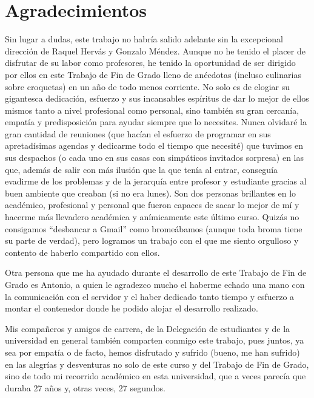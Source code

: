 
\chapter*{Agradecimientos}

Sin lugar a dudas, este trabajo no habría salido adelante sin la excepcional dirección de Raquel Hervás y Gonzalo Méndez. Aunque no he tenido el placer de disfrutar de su labor como profesores, he tenido la oportunidad de ser dirigido por ellos en este Trabajo de Fin de Grado lleno de anécdotas (incluso culinarias sobre croquetas) en un año de todo menos corriente. No solo es de elogiar su gigantesca dedicación, esfuerzo y sus incansables espíritus de dar lo mejor de ellos mismos tanto a nivel profesional como personal, sino también su gran cercanía, empatía y predisposición para ayudar siempre que lo necesites. Nunca olvidaré la gran cantidad de reuniones (que hacían el esfuerzo de programar en sus apretadísimas agendas y dedicarme todo el tiempo que necesité) que tuvimos en sus despachos (o cada uno en sus casas con simpáticos invitados sorpresa) en las que, además de salir con más ilusión que la que tenía al entrar, conseguía evadirme de los problemas y de la jerarquía entre profesor y estudiante gracias al buen ambiente que creaban (si no era lunes). Son dos personas brillantes en lo académico, profesional y personal que fueron capaces de sacar lo mejor de mí y hacerme más llevadero académica y anímicamente este último curso. Quizás no consigamos ``desbancar a Gmail'' como bromeábamos (aunque toda broma tiene su parte de verdad), pero logramos un trabajo con el que me siento orgulloso y contento de haberlo compartido con ellos.

Otra persona que me ha ayudado durante el desarrollo de este Trabajo de Fin de Grado es Antonio, a quien le agradezco mucho el haberme echado una mano con la comunicación con el servidor y el haber dedicado tanto tiempo y esfuerzo a montar el contenedor donde he podido alojar el desarrollo realizado.

Mis compañeros y amigos de carrera, de la Delegación de estudiantes y de la universidad en general también comparten conmigo este trabajo, pues juntos, ya sea por empatía o de facto, hemos disfrutado y sufrido (bueno, me han sufrido) en las alegrías y desventuras no solo de este curso y del Trabajo de Fin de Grado, sino de todo mi recorrido académico en esta universidad, que a veces parecía que duraba 27 años y, otras veces, 27 segundos.

